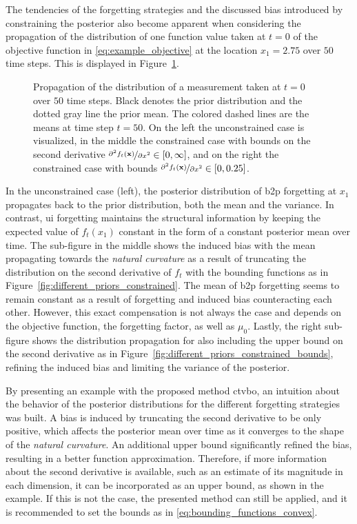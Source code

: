 The tendencies of the forgetting strategies and the discussed bias introduced by constraining the posterior also become apparent when considering the propagation of the distribution of one function value taken at $t=0$ of the objective function in \eqref{eq:example_objective} at the location $x_1=2.75$ over $50$ time steps. This is displayed in Figure~\ref{fig:distribution_propagation}.
\begin{figure}[t]
    \centering
    
    \caption[Comparing the distribution propagation for \gls{ui} and \gls{b2p} forgetting constrained and unconstrained.]{Propagation of the distribution of a measurement taken at $t=0$ over $50$ time steps. Black denotes the prior distribution and the dotted gray line the prior mean. The colored dashed lines are the means at time step $t=50$. On the left the unconstrained case is visualized, in the middle the constrained case with bounds on the second derivative $\nicefrac{\partial^2 f_t(\mathbf{x})}{\partial x^2} \in [0, \infty]$, and on the right the constrained case with bounds $\nicefrac{\partial^2 f_t(\mathbf{x})}{\partial x^2} \in [0, 0.25]$.}
    \label{fig:distribution_propagation}
\end{figure}
In the unconstrained case (left), the posterior distribution of \gls{b2p} forgetting at $x_1$ propagates back to the prior distribution, both the mean and the variance. In contrast, \gls{ui} forgetting maintains the structural information by keeping the expected value of $f_t(x_1)$ constant in the form of a constant posterior mean over time. The sub-figure in the middle shows the induced bias with the mean propagating towards the \emph{natural curvature} as a result of truncating the distribution on the second derivative of $f_t$ with the bounding functions as in Figure~\ref{fig:different_priors_constrained}. The mean of \gls{b2p} forgetting seems to remain constant as a result of forgetting and induced bias counteracting each other. However, this exact compensation is not always the case and depends on the objective function, the forgetting factor, as well as $\mu_0$. Lastly, the right sub-figure shows the distribution propagation for also including the upper bound on the second derivative as in Figure~\ref{fig:different_priors_constrained_bounds}, refining the induced bias and limiting the variance of the posterior.

By presenting an example with the proposed method \gls{ctvbo}, an intuition about the behavior of the posterior distributions for the different forgetting strategies was built. A bias is induced by truncating the second derivative to be only positive, which affects the posterior mean over time as it converges to the shape of the \emph{natural curvature}. An additional upper bound significantly refined the bias, resulting in a better function approximation. Therefore, if more information about the second derivative is available, such as an estimate of its magnitude in each dimension, it can be incorporated as an upper bound, as shown in the example. If this is not the case, the presented method can still be applied, and it is recommended to set the bounds as in \eqref{eq:bounding_functions_convex}.

